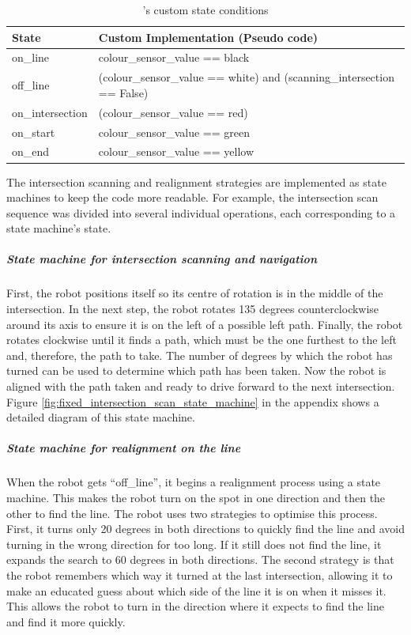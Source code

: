 \begin{table}[hbt!]
\caption{\FixedSensorRobot's custom state conditions}
\label{tab:custom_state_fixed_robot}
\centering
\begin{tabular}{l|p{\linewidth-4cm}}
\textbf{State}   & \textbf{Custom Implementation (Pseudo code)}                        \\ 
\hline
on\_line         & colour\_sensor\_value == black                                      \\
off\_line        & (colour\_sensor\_value == white) and (scanning\_intersection == False)    \\
on\_intersection & (colour\_sensor\_value == red)  \\
on\_start        & colour\_sensor\_value == green                                      \\
on\_end          & colour\_sensor\_value == yellow                                    
\end{tabular}

\end{table}

The intersection scanning and realignment strategies are implemented as state machines to keep the code more readable. For example, the intersection scan sequence was divided into several individual operations, each corresponding to a state machine's state.

\subparagraph{State machine for intersection scanning and navigation}\label{sec:fixed_intersection_scan}

First, the robot positions itself so its centre of rotation is in the middle of the intersection. In the next step, the robot rotates 135 degrees counterclockwise around its axis to ensure it is on the left of a possible left path. Finally, the robot rotates clockwise until it finds a path, which must be the one furthest to the left and, therefore, the path to take. The number of degrees by which the robot has turned can be used to determine which path has been taken. Now the robot is aligned with the path taken and ready to drive forward to the next intersection.
Figure \ref{fig:fixed_intersection_scan_state_machine} in the appendix shows a detailed diagram of this state machine.

\subparagraph{State machine for realignment on the line} \label{sec:realignment_strategy}

When the robot gets “off\_line”, it begins a realignment process using a state machine. This makes the robot turn on the spot in one direction and then the other to find the line. The robot uses two strategies to optimise this process. First, it turns only 20 degrees in both directions to quickly find the line and avoid turning in the wrong direction for too long. If it still does not find the line, it expands the search to 60 degrees in both directions. The second strategy is that the robot remembers which way it turned at the last intersection, allowing it to make an educated guess about which side of the line it is on when it misses it. This allows the robot to turn in the direction where it expects to find the line and find it more quickly.

